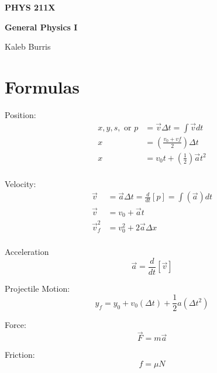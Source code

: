 \documentclass[12pt, letterpaper]{book}
\begin{document}
    \begin{titlepage}
        \Huge \textbf{PHYS 211X}

        \huge \textbf{General Physics I}

        \vfill

        \Large Kaleb Burris
    \end{titlepage}

    \section*{Formulas}
    \begin{multicols*}{2}
        Position:
        \begin{align}
            x, y, s, \text{ or } p  & = \vec{v}\Delta t = \int\vec{v}dt                     \\
                                 x  & = \left(\frac{v_{0}+v{f}}{2}\right)\Delta t           \\
                                 x  & = v_{0} t+\left(\frac{1}{2}\right)\vec{a} t^{2}       \\ 
        \end{align}

        Velocity:
        \begin{align}
            \vec{v}         & = \vec{a}\Delta t = \frac{d}{dt}[p] = \int(\vec{a})dt     \\
            \vec{v}         & = v_{0} + \vec{a}t                                        \\
            \vec{v}^{2}_{f} & = v^{2}_{0} + 2\vec{a}\Delta x                            \\
        \end{align}

        Acceleration
        \begin{equation}
            \vec{a} = \frac{d}{dt}[\vec{v}]
        \end{equation}

        Projectile Motion:
        \begin{equation}
            \label{eqn::yfinal}
            y_{f} = y_{0} + v_{0}(\Delta t) + \frac{1}{2}a(\Delta t^{2})
        \end{equation}

        Force:
        \begin{equation}
            \vec{F} = m\vec{a}
        \end{equation}

        Friction:
        \begin{equation}
            f = \mu N
        \end{equation}


\end{multicols*}
\end{document}
